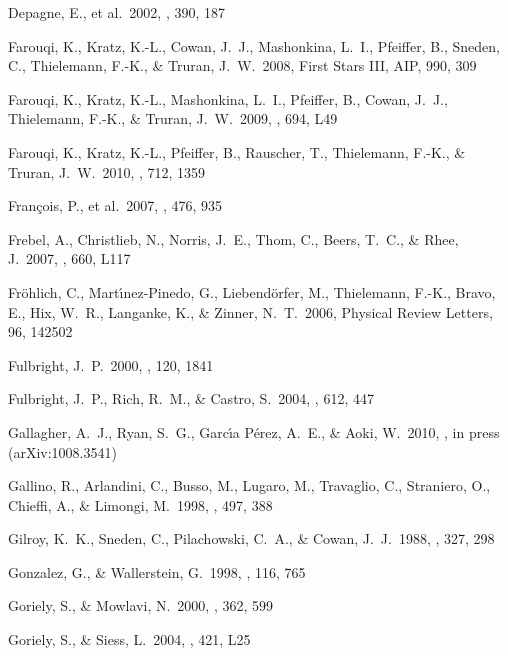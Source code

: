 \documentclass{emulateapj}
\begin{document}
\begin{thebibliography}{}
 Depagne, E., et al.\ 2002, \aap, 
390, 187 

 Farouqi, K., Kratz, 
K.-L., Cowan, J.~J., Mashonkina, L.~I., Pfeiffer, B., Sneden, C., 
Thielemann, F.-K., \& Truran, J.~W.\ 2008, First Stars III, AIP, 990, 309 

 Farouqi, K., Kratz, 
K.-L., Mashonkina, L.~I., Pfeiffer, B., Cowan, J.~J., Thielemann, F.-K., 
\& Truran, J.~W.\ 2009, \apjl, 694, L49 

 Farouqi, K., Kratz, 
K.-L., Pfeiffer, B., Rauscher, T., Thielemann, F.-K., 
\& Truran, J.~W.\ 2010, \apj, 712, 1359 

 Fran{\c c}ois, P., 
et al.\ 2007, \aap, 476, 935 

 Frebel, A., Christlieb, N., 
Norris, J.~E., Thom, C., Beers, T.~C., \& Rhee, J.\ 2007, \apjl, 660, L117 

 Fr{\"o}hlich, C., 
Mart{\'{\i}}nez-Pinedo, G., Liebend{\"o}rfer, M., Thielemann, F.-K., Bravo, 
E., Hix, W.~R., Langanke, K., 
\& Zinner, N.~T.\ 2006, Physical Review Letters, 96, 142502 

 Fulbright, J.~P.\ 2000, \aj, 120, 1841 

 Fulbright, J.~P., 
Rich, R.~M., \& Castro, S.\ 2004, \apj, 612, 447 

 Gallagher, A.~J., 
Ryan, S.~G., Garc{\'{\i}}a P{\'e}rez, A.~E., 
\& Aoki, W.\ 2010, \aap, in press (arXiv:1008.3541)

 Gallino, R., Arlandini, 
C., Busso, M., Lugaro, M., Travaglio, C., Straniero, O., Chieffi, A., 
\& Limongi, M.\ 1998, \apj, 497, 388 

 Gilroy, K.~K., Sneden, 
C., Pilachowski, C.~A., \& Cowan, J.~J.\ 1988, \apj, 327, 298 

 Gonzalez, G., \& 
Wallerstein, G.\ 1998, \aj, 116, 765 

 Goriely, S., \& 
Mowlavi, N.\ 2000, \aap, 362, 599 

 Goriely, S., \& Siess, L.\ 
2004, \aap, 421, L25 


\end{thebibliography}
\end{document}
